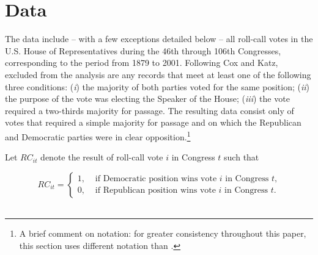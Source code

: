 \section{Data}
\label{ckdata}

The data include -- with a few exceptions detailed below -- all roll-call votes in the 
U.S. House of Representatives during the 46th through 106th Congresses, corresponding 
to the period from 1879 to 2001.  Following Cox and Katz, excluded from the analysis are 
any records that meet at least one of the following three conditions: ({\it i}) the majority of 
both parties voted for the same position; ({\it ii}) the purpose of the vote was electing the 
Speaker of the House; ({\it iii}) the vote required a two-thirds majority for passage.
The resulting data consist only of votes that required a simple majority for passage and on 
which the Republican and Democratic parties were in clear opposition.\footnote{A brief 
comment on notation: for greater consistency throughout this paper, this section uses different 
notation than .}

Let $RC_{it}$ denote the result of roll-call vote $i$ in Congress $t$ such that 

\begin{equation*}
RC_{it} =
\begin{cases} 
1, & \text{ if Democratic position wins vote $i$ in Congress $t$,} \\[10pt]
0, & \text{ if Republican position wins vote $i$ in Congress $t$.}
\end{cases}
\end{equation*}
~\\[-12pt]


